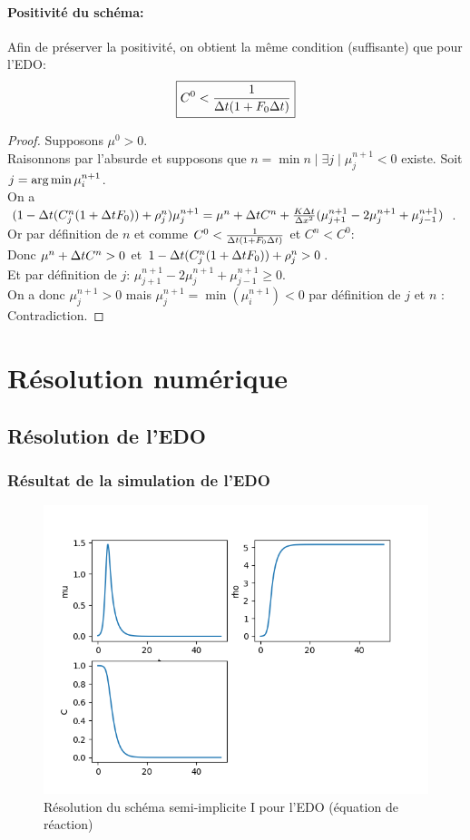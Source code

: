 \documentclass[11pt]{article}
\begin{document}
\paragraph{Positivité du schéma:}
Afin de préserver la positivité, on obtient la même condition (suffisante) que pour l'EDO:
\begin{equation}
	\boxed{C^0< \frac{1}{\Delta t(1+F_0\Delta t)}}
\end{equation}
\begin{proof} Supposons $\mu^0 >0$.\\ Raisonnons par l'absurde et supposons que $n=\min{n \mid \exists j \mid \mu^{n+1}_j < 0} $ existe. Soit $j = \operatorname*{arg\,min}{\mu^{n+1}_i}  $.\\

On a $(1-\Delta t(C^{n}_j(1+\Delta t F_0)) + \rho^{n}_j)\mu^{n+1}_j = \mu^{n}+  \Delta t C^{n} +\frac{K\Delta t}{\Delta x^2}(\mu^{n+1}_{j+1} - 2\mu^{n+1}_j + \mu^{n+1}_{j-1})$ . \\
Or par définition de $n$ et comme $C^0< \frac{1}{\Delta t(1+F_0\Delta t)}$ et $C^n < C^0$:\\
 Donc $ \mu^{n}+  \Delta t C^{n} > 0$ et
 $ 1-\Delta t(C^{n}_j(1+\Delta t F_0)) + \rho^{n}_j > 0$. \\
Et par définition de $j$: 
$\mu^{n+1}_{j+1} - 2\mu^{n+1}_j + \mu^{n+1}_{j-1} \geq 0$.\\
On a donc $\mu^{n+1}_j > 0$ mais   $\mu^{n+1}_j = \min(\mu^{n+1}_i) < 0$ par définition de $j$ et $n$ : Contradiction.
\end{proof}

\newpage
\section{Résolution numérique}
\subsection{Résolution de l'EDO}
\subsubsection{Résultat de la simulation de l'EDO}
\begin{figure}[hbt!]
\centering
\includegraphics[width=.9\textwidth]{Images/edo_euler_implicite.png}
\caption{Résolution du schéma semi-implicite I pour l'EDO (équation de réaction)}
\end{figure}
\end{document}
